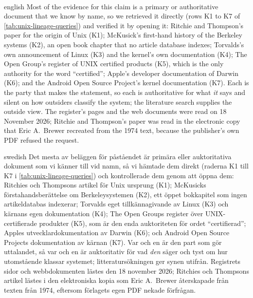 \paragraph{} %
\begin{onlyin}{english} %
Most of the evidence for this claim is a primary or authoritative
document that we know by name, so we retrieved it directly (rows K1 to K7
of \cref{tab:unix-lineage-queries}) and verified it by opening it:
Ritchie and Thompson's paper for the origin of Unix (K1);
McKusick's first-hand history of the Berkeley systems (K2), an open
book chapter that no article database indexes;
Torvalds's own announcement of Linux (K3) and the kernel's own
documentation (K4);
The Open Group's register of UNIX certified products (K5), which is the
only authority for the word \enquote{certified};
Apple's developer documentation of Darwin (K6);
and the Android Open Source Project's kernel documentation (K7).
Each is the party that makes the statement, so each is authoritative for
what \emph{it} says and silent on how outsiders classify the system; the
literature search supplies the outside view.
The register's pages and the web documents were read on 18 November 2026;
Ritchie and Thompson's paper was read in the electronic copy that
Eric A.\ Brewer recreated from the 1974 text, because the publisher's
own PDF refused the request.
\end{onlyin}
\begin{onlyin}{swedish}
Det mesta av beläggen för påståendet är primära eller auktoritativa
dokument som vi känner till vid namn, så vi hämtade dem direkt (raderna
K1 till K7 i \cref{tab:unix-lineage-queries}) och kontrollerade dem
genom att öppna dem:
Ritchies och Thompsons artikel för Unix ursprung (K1);
McKusicks förstahandsberättelse om Berkeleysystemen (K2), ett öppet
bokkapitel som ingen artikeldatabas indexerar;
Torvalds eget tillkännagivande av Linux (K3) och kärnans egen
dokumentation (K4);
The Open Groups register över UNIX-certifierade produkter (K5), som är
den enda auktoriteten för ordet \enquote{certifierad};
Apples utvecklardokumentation av Darwin (K6);
och Android Open Source Projects dokumentation av kärnan (K7).
Var och en är den part som gör uttalandet, så var och en är auktoritativ
för vad \emph{den} säger och tyst om hur utomstående klassar systemet;
litteratursökningen ger synen utifrån.
Registrets sidor och webbdokumenten lästes den 18 november 2026;
Ritchies och Thompsons artikel lästes i den elektroniska kopia som
Eric A.\ Brewer återskapade från texten från 1974, eftersom förlagets
egen PDF nekade förfrågan.
\end{onlyin}

